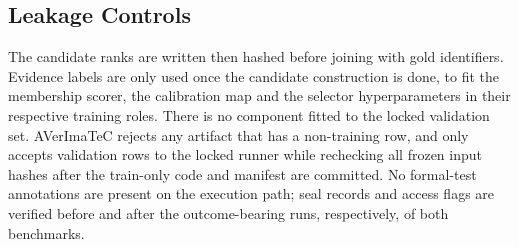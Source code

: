 \subsection{Leakage Controls}

The candidate ranks are written then hashed before joining with gold identifiers. Evidence labels are only used once the candidate construction is done, to fit the membership scorer, the calibration map and the selector hyperparameters in their respective training roles. There is no component fitted to the locked validation set. AVerImaTeC rejects any artifact that has a non-training row, and only accepts validation rows to the locked runner while rechecking all frozen input hashes after the train-only code and manifest are committed. No formal-test annotations are present on the execution path; seal records and access flags are verified before and after the outcome-bearing runs, respectively, of both benchmarks.
